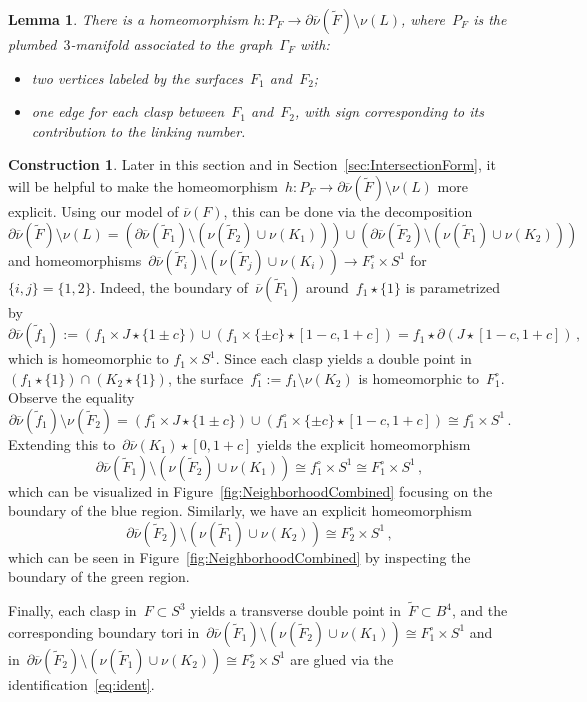 \documentclass[10.9pt,a4paper]{amsart}
\newtheorem{lemma}[theorem]{Lemma}
\theoremstyle{definition}
\newtheorem{construction}[theorem]{Construction}
\theoremstyle{remark}
\newcommand{\onu}{\overline{\nu}}
\begin{document}
\begin{lemma}
\label{lemma:HomeoPF}
There is a homeomorphism $h\colon P_F \to \partial \onu(\tilde{F}) \setminus \nu(L)$, where~$P_F$ is the plumbed~$3$-manifold associated to the graph~$\Gamma_F$ with:
\begin{itemize}
  \item two vertices labeled by the surfaces~$F_1$ and~$F_2$;
  \item one edge for each clasp between~$F_1$ and~$F_2$, with sign corresponding to  its contribution to the linking number.
\end{itemize}
\end{lemma}
\begin{construction}
\label{cons:Homeoh}
Later in this section and in Section~\ref{sec:IntersectionForm},  it will be helpful to make the homeomorphism~$h\colon P_F \to \partial \onu(\tilde{F}) \setminus \nu(L)$ more explicit. 
Using our model of $\overline{\nu}(F)$, this can be done via the decomposition
\[
\partial\onu(\tilde{F}) \setminus \nu(L) = 
\left(\partial \onu(\tilde{F}_1) \setminus \left(\nu(\tilde{F}_2)\cup\nu(K_1)\right)\right)
\cup 
\left(\partial \onu(\tilde{F}_2) \setminus \left(\nu(\tilde{F}_1)\cup\nu(K_2)\right)\right)
\]
and homeomorphisms~$\partial \onu(\tilde{F}_i) \setminus \left(\nu(\tilde{F}_j)\cup\nu(K_i)\right)\to F_i^\circ \times S^1$
for~$\{i,j\}=\{1,2\}$.
Indeed, the boundary of~$\onu(\tilde{F}_1)$ around~$f_1 \star \{1\}$ is parametrized by
\[
\partial\onu(\tilde{f}_1):=(f_1 \times J \star \{1 \pm c\}) \cup (f_1 \times \{\pm c\} \star [1-c,1+c])=f_1\star\partial(J\star[1-c,1+c])\,,
\]
which is homeomorphic to $f_1 \times S^1$.
Since each clasp yields a double point in~$(f_1 \star \{1\}) \cap (K_2 \star \{1\})$, the surface~$f^\circ_1:=f_1\setminus\nu(K_2)$ is homeomorphic to~$F_1^\circ$. Observe the equality
\[
\partial \onu(\tilde{f}_1) \setminus \nu(\tilde{F}_2) = 
(f_1^\circ \times J \star \{1 \pm c\}) \cup 
(f_1^\circ \times \{\pm c\} \star [1-c,1+c])\cong f^\circ_1\times S^1\,.
\]
Extending this to~$\partial \onu(K_1) \star [0,1+c]$ yields the explicit homeomorphism
\[
\partial \onu(\tilde{F}_1) \setminus \left(\nu(\tilde{F}_2)\cup\nu(K_1)\right)\cong f_1^\circ \times S^1\cong F_1^\circ \times S^1\,,
\]
which can be visualized in Figure~\ref{fig:NeighborhoodCombined} focusing on the boundary of the blue region.
Similarly, we have an explicit homeomorphism
\[
\partial \onu(\tilde{F}_2) \setminus \left(\nu(\tilde{F}_1)\cup\nu(K_2)\right)\cong F_2^\circ \times S^1\,,
\]
which can be seen in Figure~\ref{fig:NeighborhoodCombined} by inspecting the boundary of the green region.

Finally, each clasp in~$F\subset S^3$ yields a transverse double point in~$\tilde{F}\subset B^4$,
and the corresponding boundary tori in~$\partial \onu(\tilde{F}_1) \setminus \left(\nu(\tilde{F}_2)\cup\nu(K_1)\right)\cong F_1^\circ \times S^1$ and in~$\partial \onu(\tilde{F}_2) \setminus \left(\nu(\tilde{F}_1)\cup\nu(K_2)\right)\cong F_2^\circ \times S^1$ are glued via the identification~\eqref{eq:ident}.
\end{construction}
\end{document}
